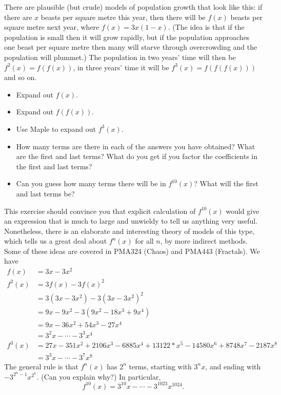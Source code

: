 \documentclass[a4paper]{book}
\renewcommand{\:}{\colon}
\newcommand{\mathworld}[1]{}
\newcommand{\PMA}[1]{PMA#1}
\theoremstyle{definition}
\newenvironment{starex}{
 \renewcommand{\thetheorem}{\arabic{chapter}.\arabic{section}.\arabic{theorem}${}^*$}
 \exercise
}{\endexercise}
\renewenvironment{solution}{\SolutionInline}{\endSolutionInline}
\begin{document}
\begin{starex}
 There are plausible (but crude) models of population growth
 \mathworld{LogisticMap} that look like this: if there are $x$ beasts
 per square metre this year, then there will be $f(x)$ beasts per square
 metre next year, where $f(x)=3x(1-x)$.  (The idea is that if the
 population is small then it will grow rapidly, but if the population
 approaches one beast per square metre then many will starve
 through overcrowding and the population will plummet.)  The population
 in two years' time will then be $f^2(x)=f(f(x))$, in three years' time
 it will be $f^3(x)=f(f(f(x)))$ and so on.
 \begin{itemize}
  \item Expand out $f(x)$.
  \item Expand out $f(f(x))$.
  \item Use Maple to expand out $f^3(x)$.
  \item How many terms are there in each of the answers you have
   obtained?  What are the first and last terms?  What do you get if
   you factor the coefficients in the first and last terms?
  \item Can you guess how many terms there will be in $f^{10}(x)$?
   What will the first and last terms be?
 \end{itemize}
 This exercise should convince you that explicit calculation of
 $f^{10}(x)$ would give an expression that is much to large and
 unwieldy to tell us anything very useful.  Nonetheless, there is an
 elaborate and interesting theory of models of this type, which tells
 us a great deal about $f^n(x)$ for all $n$, by more indirect
 methods.  Some of these ideas are covered in \PMA{324} (Chaos) and
 \PMA{443} (Fractals).
\end{starex}
\begin{solution}
 We have
 \begin{align*}
  f(x)   &= 3x - 3x^2 \\
  f^2(x) &= 3f(x) - 3f(x)^2 \\
         &= 3(3x-3x^2) - 3(3x-3x^2)^2 \\
         &= 9x - 9x^2 - 3(9x^2 - 18 x^3 + 9x^4) \\
         &= 9x - 36x^2 + 54 x^3 - 27 x^4 \\
         &= 3^2x - \cdots - 3^3 x^4 \\
  f^3(x) &= 27x-351x^2+2106x^3-6885x^4+
            13122*x^5-14580x^6+8748x^7-2187x^8 \\
         &= 3^3x - \cdots - 3^7 x^8
 \end{align*}
 The general rule is that $f^n(x)$ has $2^n$ terms, starting with
 $3^nx$, and ending with $-3^{2^n-1}x^{2^n}$.  (Can you explain why?)
 In particular,
 \[ f^{10}(x) = 3^{10}x - \cdots - 3^{1023}x^{1024}. \]
\end{solution}
\end{document}
